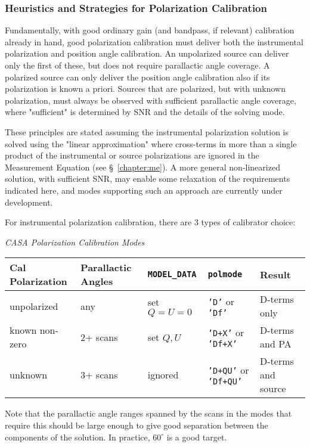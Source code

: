 \subsubsection{Heuristics and Strategies for Polarization Calibration }
\label{section:cal.solve.pol.hstics}

Fundamentally, with good ordinary gain (and bandpass, if relevant)
calibration already in hand, good polarization calibration must
deliver both the instrumental polarization and position angle
calibration.  An unpolarized source can deliver only the first of
these, but does not require parallactic angle coverage.  A polarized
source can only deliver the position angle calibration also if its
polarization is known a priori.  Sources that are polarized, but with
unknown polarization, must always be observed with sufficient
parallactic angle coverage, where "sufficient" is determined by SNR
and the details of the solving mode.

These principles are stated assuming the instrumental polarization
solution is solved using the "linear approximation" where cross-terms
in more than a single product of the instrumental or source
polarizations are ignored in the Measurement Equation (see 
\S~\ref{chapter:me}).
A more general non-linearized solution, with sufficient SNR, may enable 
some relaxation of the requirements indicated here, and modes supporting
such an approach are currently under development.

For instrumental polarization calibration, there are 3 types of
calibrator choice:
\begin{center}
{\it CASA Polarization Calibration Modes}\\[5mm]
\begin{tabular}{|l|l|l|l|l|}
\hline
Cal Polarization & Parallactic Angles & {\tt MODEL\_DATA} & 
    {\tt polmode} & Result \\
\hline
unpolarized & any & set $Q=U=0$ & {\tt 'D'} or {\tt 'Df'} & D-terms
  only \\
known non-zero & 2+ scans & set $Q,U$ & {\tt 'D+X'} or 
  {\tt 'Df+X'} & D-terms and PA \\
unknown & 3+ scans & ignored & {\tt 'D+QU'} or {\tt 'Df+QU'} &
  D-terms and source \\
\hline
\end{tabular}
\end{center}
Note that the parallactic angle ranges spanned by the scans in the
modes that require this should be large enough to give good separation
between the components of the solution.  In practice, $60^\circ$ is 
a good target.

